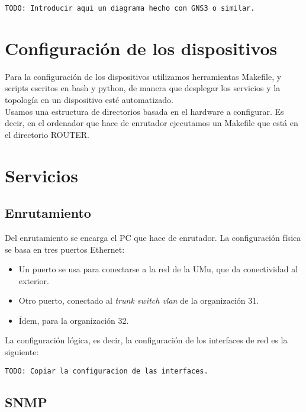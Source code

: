 \documentclass[]{article}
\begin{document}
\begin{lstlisting}
TODO: Introducir aqui un diagrama hecho con GNS3 o similar.
\end{lstlisting}

\section{Configuración de los dispositivos}

Para la configuración de los dispositivos utilizamos herramientas Makefile, y scripts escritos en bash y python, de manera que desplegar los servicios y la topología en un dispositivo esté automatizado.
\\

Usamos una estructura de directorios basada en el hardware a configurar. Es decir, en el ordenador que hace de enrutador ejecutamos un Makefile que está en el directorio ROUTER.

\section{Servicios}

\subsection{Enrutamiento}

Del enrutamiento se encarga el PC que hace de enrutador. La configuración física se basa en tres puertos Ethernet:

\begin{itemize}
	\item Un puerto se usa para conectarse a la red de la UMu, que da conectividad al exterior. 
	\item Otro puerto, conectado al \textit{trunk switch vlan} de la organización 31.
	\item Ídem, para la organización 32.
\end{itemize}

La configuración lógica, es decir, la configuración de los interfaces de red es la siguiente:

\begin{lstlisting}
TODO: Copiar la configuracion de las interfaces.
\end{lstlisting}

\subsection{SNMP}
\end{document}

